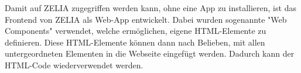 \label{sec:webcomponents}

Damit auf ZELIA zugegriffen werden kann, ohne eine App zu installieren, ist das Frontend von ZELIA als Web-App entwickelt. Dabei wurden sogenannte "Web Components" verwendet, welche ermöglichen, eigene HTML-Elemente zu definieren. Diese HTML-Elemente können dann nach Belieben, mit allen untergeordneten Elementen in die Webseite eingefügt werden. Dadurch kann der HTML-Code wiederverwendet werden.


\pagebreak

